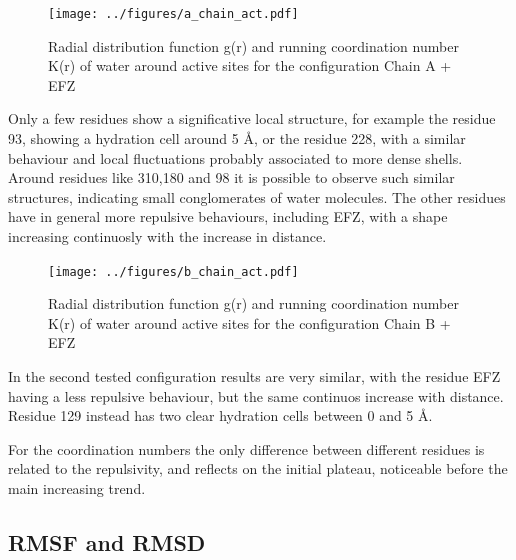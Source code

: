 \documentclass[12pt]{article}
\begin{document}
\begin{figure}
    \centering
    \texttt{[image: ../figures/a\_chain\_act.pdf]}
    \caption{Radial distribution function g(r) and running coordination number K(r) of water around active sites for the configuration Chain A + EFZ\label{fig:gofr_chain_a_efz}}
\end{figure}

Only a few residues show a significative local structure, for example the residue 93, showing a hydration cell around
5 \AA, or the residue 228, with a similar behaviour and local fluctuations probably associated to more dense shells.
Around residues like 310,180 and 98 it is possible to observe such similar structures, indicating small conglomerates of water molecules. The other residues have in general more repulsive behaviours, including EFZ, with a shape increasing continuosly with the increase in distance.

\begin{figure}
    \centering
    \texttt{[image: ../figures/b\_chain\_act.pdf]}
    \caption{Radial distribution function g(r) and running coordination number K(r) of water around active sites for the configuration Chain B + EFZ\label{fig:gofr_chain_b_efz}}
\end{figure}

In the second tested configuration results are very similar, with the residue EFZ having a less repulsive behaviour, but the same continuos increase with distance. Residue 129 instead has two clear hydration cells between 0 and 5 \AA.

For the coordination numbers the only difference between different residues is related to the repulsivity, and reflects on the initial plateau, noticeable before the main increasing trend.

\subsection{RMSF and RMSD}

\end{document}

